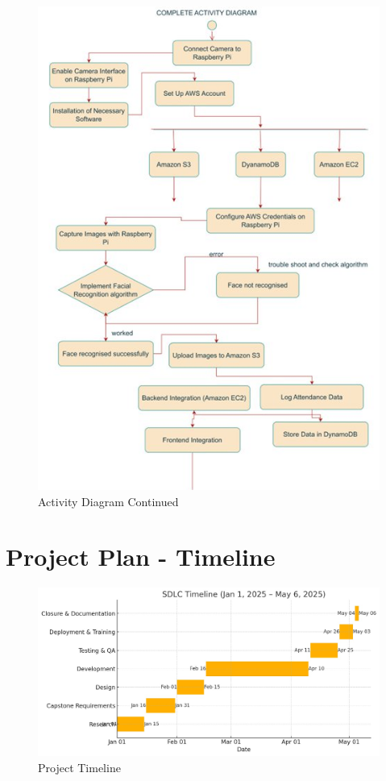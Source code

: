 \documentclass[openany]{report}
\begin{document}
\begin{figure}[H]
    \centering
    \includegraphics[width=.95\textwidth]{../imgs/activity 2.jpg}
    \caption{Activity Diagram Continued}
\end{figure}

\chapter{Project Plan - Timeline}
\begin{figure}[H]
    \centering
    \includegraphics[width=.95\textwidth]{../imgs/timeline.jpg}
    \caption{Project Timeline}
\end{figure}
\end{document}
